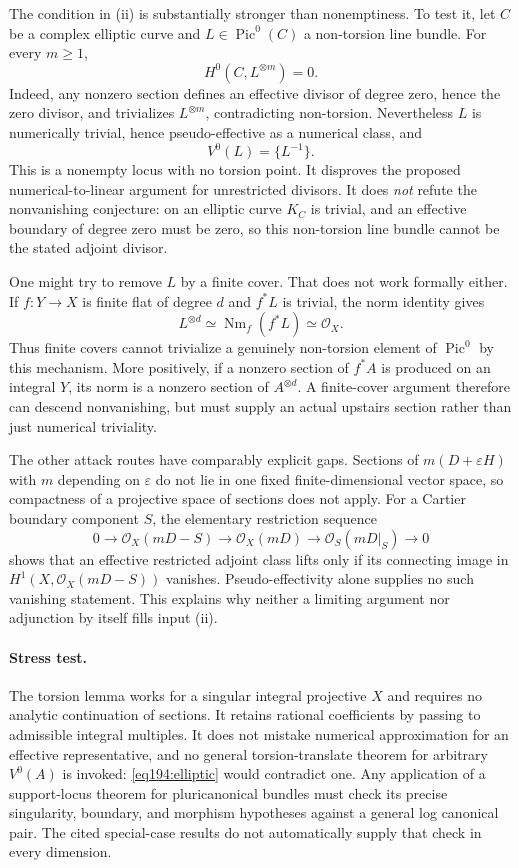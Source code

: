 \documentclass[11pt,a4paper]{article}
\numberwithin{equation}{section}
\begin{document}
The condition in (ii) is substantially stronger than nonemptiness. To test it, let $C$ be a complex elliptic curve and $L\in\operatorname{Pic}^0(C)$ a non-torsion line bundle. For every $m\ge1$,
\begin{equation}\label{eq194:elliptic}
 H^0(C,L^{\otimes m})=0.
\end{equation}
Indeed, any nonzero section defines an effective divisor of degree zero, hence the zero divisor, and trivializes $L^{\otimes m}$, contradicting non-torsion. Nevertheless $L$ is numerically trivial, hence pseudo-effective as a numerical class, and
\[
 V^0(L)=\{L^{-1}\}.
\]
This is a nonempty locus with no torsion point. It disproves the proposed numerical-to-linear argument for unrestricted divisors. It does \emph{not} refute the nonvanishing conjecture: on an elliptic curve $K_C$ is trivial, and an effective boundary of degree zero must be zero, so this non-torsion line bundle cannot be the stated adjoint divisor.

One might try to remove $L$ by a finite cover. That does not work formally either. If $f:Y\to X$ is finite flat of degree $d$ and $f^*L$ is trivial, the norm identity gives
\[
 L^{\otimes d}\simeq\operatorname{Nm}_f(f^*L)\simeq\mathcal O_X.
\]
Thus finite covers cannot trivialize a genuinely non-torsion element of $\operatorname{Pic}^0$ by this mechanism. More positively, if a nonzero section of $f^*A$ is produced on an integral $Y$, its norm is a nonzero section of $A^{\otimes d}$. A finite-cover argument therefore can descend nonvanishing, but must supply an actual upstairs section rather than just numerical triviality.

The other attack routes have comparably explicit gaps. Sections of $m(D+\varepsilon H)$ with $m$ depending on $\varepsilon$ do not lie in one fixed finite-dimensional vector space, so compactness of a projective space of sections does not apply. For a Cartier boundary component $S$, the elementary restriction sequence
\[
 0\longrightarrow\mathcal O_X(mD-S)\longrightarrow\mathcal O_X(mD)
 \longrightarrow\mathcal O_S(mD|_S)\longrightarrow0
\]
shows that an effective restricted adjoint class lifts only if its connecting image in $H^1(X,\mathcal O_X(mD-S))$ vanishes. Pseudo-effectivity alone supplies no such vanishing statement. This explains why neither a limiting argument nor adjunction by itself fills input (ii).

\paragraph{Stress test.}
The torsion lemma works for a singular integral projective $X$ and requires no analytic continuation of sections. It retains rational coefficients by passing to admissible integral multiples. It does not mistake numerical approximation for an effective representative, and no general torsion-translate theorem for arbitrary $V^0(A)$ is invoked: \eqref{eq194:elliptic} would contradict one. Any application of a support-locus theorem for pluricanonical bundles must check its precise singularity, boundary, and morphism hypotheses against a general log canonical pair. The cited special-case results do not automatically supply that check in every dimension.
\end{document}

